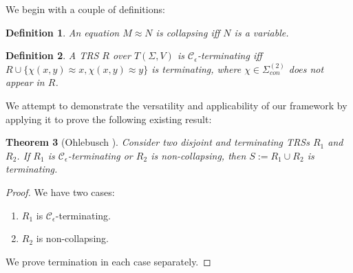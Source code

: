 \documentclass{article}
\newtheorem{theorem}{Theorem}[section]
\newtheorem{definition}[theorem]{Definition}
\renewcommand\em{\bfseries}
\begin{document}
We begin with a couple of definitions:
\begin{definition}
    An equation $M \approx N$ is \emph{collapsing} iff $N$ is a variable.
\end{definition}
\begin{definition}
    A TRS $R$ over $T(\Sigma, V)$ is \emph{$\mathcal{C}_\epsilon$-terminating} iff $R \cup \{\chi(x, y) \approx x, \chi (x, y)\approx y\}$ is terminating, where $\chi \in \Sigma^{(2)}_{con}$ does not appear in $R$.   
\end{definition}

We attempt to demonstrate the versatility and applicability of our framework by applying it to prove the following existing result:
\begin{theorem}[Ohlebusch \cite{ohlebusch1994modular}]
    Consider two disjoint and terminating TRSs $R_1$ and $R_2$. If $R_1$ is $\mathcal{C}_\epsilon$-terminating or $R_2$ is non-collapsing, then $S := R_1 \cup R_2$ is terminating.
\end{theorem}

\begin{proof}
    We have two cases: \begin{enumerate}
        \item $R_1$ is $\mathcal{C}_\epsilon$-terminating.
        \item $R_2$ is non-collapsing.
    \end{enumerate}
    We prove termination in each case separately.


\end{proof}


\renewcommand\em{\it}
\printbibliography[title={References}]
\end{document}
